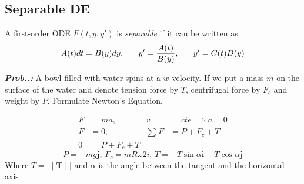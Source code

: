 \documentclass[a4paper]{article}
\begin{document}
\subsection{Separable DE}
\setcounter{equation}{0}

A first-order ODE $F(t,y,y')$ is \textit{separable} if it can be written as
$$
A(t)dt=B(y)dy,\hspace{4ex}y'=\frac{A(t)}{B(y)},\hspace{4ex}y'=C(t)D(y)
$$

\vspace{2ex}\textit{\textbf{Prob.\thesection.\theprob:}} A bowl filled with water spins at a $w$ velocity. If we put a mass $m$ on the surface of the water and denote tension force by $T$, centrifugal force by $F_{c}$ and weight by $P$. Formulate Newton's Equation.

\begin{align}
F&=ma, & v&=cte\implies a=0 \\
F&=0, & \sum^{}_{}F&=P+F_{c}+T \\
0&= P+F_{c}+T
\end{align}
$$
P=-mg\mathbf{j},\, F_{c}=mR\omega 2i,\, T=-T\sin \alpha \mathbf{i} + T\cos \alpha \mathbf{j}
$$
Where $T=\mid\mid \mathbf{T}\mid\mid$ and $\alpha$ is the angle between the tangent and the horizontal axis
\end{document}
